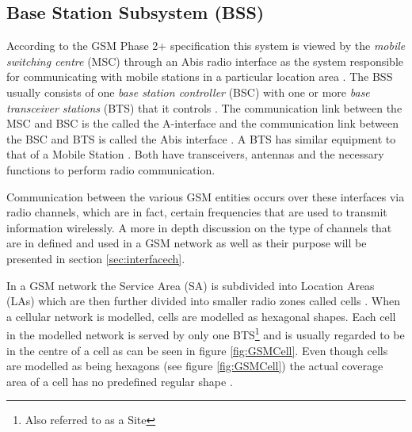 \subsection{Base Station Subsystem (BSS)}

According to the GSM Phase 2+ specification this system is viewed by the \emph{mobile switching centre} (MSC) through an Abis radio interface as the system responsible for communicating with mobile stations in a particular location area \cite{Eisenblatter}. The BSS usually consists of one \emph{base station controller} (BSC) with one or more \emph{base transceiver stations} (BTS) that it controls \cite{Eisenblatter}. The communication link between the MSC and BSC is the called the A-interface and the communication link between the BSC and BTS is called the Abis interface \cite{Eisenblatter}. A BTS has similar equipment to that of a Mobile Station \cite{GSMSysEngin}. Both have transceivers, antennas and the necessary functions to perform radio communication. 

Communication between the various GSM entities occurs over these interfaces via radio channels, which are in fact, certain frequencies that are used to transmit information wirelessly. A more in depth discussion on the type of channels that are in defined and used in a GSM network as well as their purpose will be presented in section \ref{sec:interfacech}.

In a GSM network the Service Area (SA) is subdivided into Location Areas (LAs) which are then further divided into smaller radio zones called cells \cite{GSMSecurInTeleNetwork}. When a cellular network is modelled, cells are modelled as hexagonal shapes. Each cell in the modelled network is served by only one BTS\footnote{Also referred to as a Site} and is usually regarded to be in the centre of a cell as can be seen in figure \ref{fig:GSMCell}\cite{GSMArchitectureProtocolsServices}. Even though cells are modelled as being hexagons (see figure \ref{fig:GSMCell}) the actual coverage area of a cell has no predefined regular shape \cite{GSMArchitectureProtocolsServices}.

